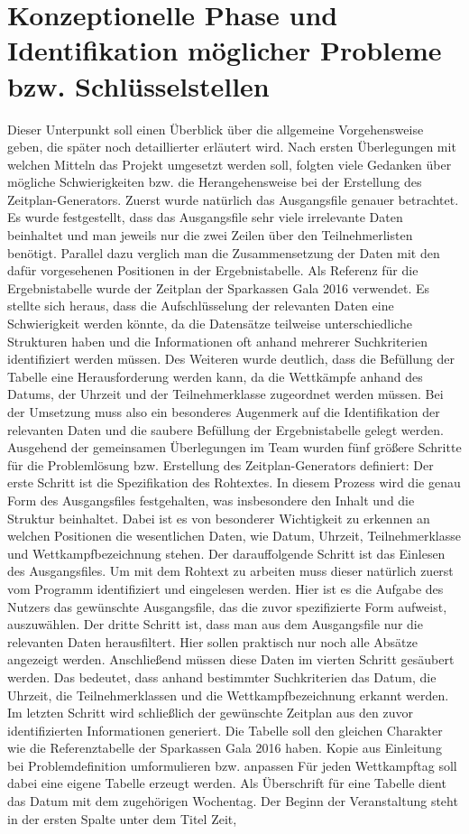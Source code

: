 \section{Konzeptionelle Phase und Identifikation möglicher Probleme bzw. Schlüsselstellen
}
Dieser Unterpunkt soll einen Überblick über die allgemeine Vorgehensweise geben, die später noch detaillierter erläutert wird. Nach ersten Überlegungen mit welchen Mitteln das Projekt umgesetzt werden soll, folgten viele Gedanken über mögliche Schwierigkeiten bzw. die Herangehensweise bei der Erstellung des Zeitplan-Generators. Zuerst wurde natürlich das Ausgangsfile genauer betrachtet. Es wurde festgestellt, dass das Ausgangsfile sehr viele irrelevante Daten beinhaltet und man jeweils nur die zwei Zeilen über den Teilnehmerlisten benötigt. Parallel dazu verglich man die Zusammensetzung der Daten mit den dafür vorgesehenen Positionen in der Ergebnistabelle. Als Referenz für die Ergebnistabelle wurde der Zeitplan der Sparkassen Gala 2016 verwendet. Es stellte sich heraus, dass die Aufschlüsselung der relevanten Daten eine Schwierigkeit werden könnte, da die Datensätze teilweise unterschiedliche Strukturen haben und die Informationen oft anhand mehrerer Suchkriterien identifiziert werden müssen. Des Weiteren wurde deutlich, dass die Befüllung der Tabelle eine Herausforderung werden kann, da die Wettkämpfe anhand des Datums, der Uhrzeit und der Teilnehmerklasse zugeordnet werden müssen. Bei der Umsetzung muss also ein besonderes Augenmerk auf die Identifikation der relevanten Daten und die saubere Befüllung der Ergebnistabelle gelegt werden. Ausgehend der gemeinsamen Überlegungen im Team wurden fünf größere Schritte für die Problemlösung bzw. Erstellung des Zeitplan-Generators definiert: Der erste Schritt ist die Spezifikation des Rohtextes. In diesem Prozess wird die genau Form des Ausgangsfiles festgehalten, was insbesondere den Inhalt und die Struktur beinhaltet. Dabei ist es von besonderer Wichtigkeit zu erkennen an welchen Positionen die wesentlichen Daten, wie Datum, Uhrzeit, Teilnehmerklasse und Wettkampfbezeichnung stehen. Der darauffolgende Schritt ist das Einlesen des Ausgangsfiles. Um mit dem Rohtext zu arbeiten muss dieser natürlich zuerst vom Programm identifiziert und eingelesen werden. Hier ist es die Aufgabe des Nutzers das gewünschte Ausgangsfile, das die zuvor spezifizierte Form aufweist, auszuwählen. Der dritte Schritt ist, dass man aus dem Ausgangsfile nur die relevanten Daten herausfiltert. Hier sollen praktisch nur noch alle Absätze angezeigt werden. Anschließend müssen diese Daten im vierten Schritt gesäubert werden. Das bedeutet, dass anhand bestimmter Suchkriterien das Datum, die Uhrzeit, die Teilnehmerklassen und die Wettkampfbezeichnung erkannt werden. Im letzten Schritt wird schließlich der gewünschte Zeitplan aus den zuvor identifizierten Informationen generiert. Die Tabelle soll den gleichen Charakter wie die Referenztabelle der Sparkassen Gala 2016 haben. Kopie aus Einleitung bei Problemdefinition  umformulieren bzw. anpassen Für jeden Wettkampftag soll dabei eine eigene Tabelle erzeugt werden. Als Überschrift für eine Tabelle dient das Datum mit dem zugehörigen Wochentag. Der Beginn der Veranstaltung steht in der ersten Spalte unter dem Titel Zeit, 